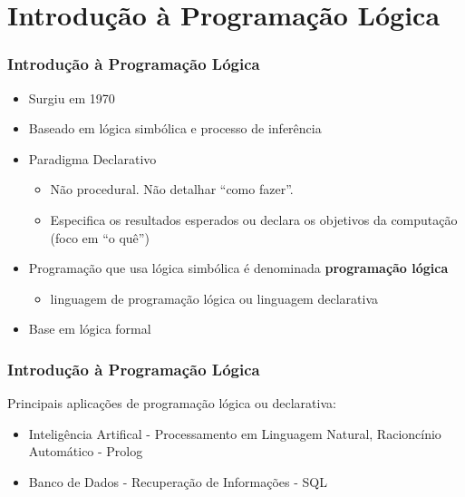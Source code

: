 \section{Introdução à Programação Lógica}

\begin{frame}
	\frametitle{Introdução à Programação Lógica}
	\begin{itemize}
		\item Surgiu em 1970
		\item Baseado em lógica simbólica e processo de inferência
		\item Paradigma Declarativo
		\begin{itemize}
			\item Não procedural. Não detalhar ``como fazer''.
			\item Especifica os resultados esperados ou declara os objetivos da computação (foco em ``o quê'')
		\end{itemize}
		\item Programação que usa lógica simbólica é denominada \textbf{programação lógica}
		\begin{itemize}
			\item linguagem de programação lógica ou linguagem declarativa
		\end{itemize}
		\item Base em lógica formal
	\end{itemize}
\end{frame}


\begin{frame}
	\frametitle{Introdução à Programação Lógica}
	Principais aplicações de programação lógica ou declarativa:
	\begin{itemize}
		\item Inteligência Artifical - Processamento em Linguagem Natural, Racioncínio Automático - Prolog
		\item Banco de Dados - Recuperação de Informações - SQL
	\end{itemize}
\end{frame}


